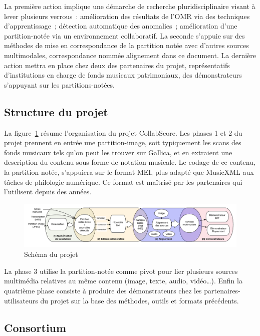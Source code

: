 \documentclass[11pt]{article}
\begin{document}
La première action implique une démarche de recherche pluridisciplinaire visant à lever plusieurs verrous : 
amélioration des résultats de l’OMR via des techniques d’apprentissage ; détection automatique des anomalies ; 
amélioration d’une partition-notée via un environnement collaboratif.  La seconde s’appuie sur des méthodes de 
mise en correspondance de la partition notée avec d’autres sources multimodales, correspondance nommée alignement dans ce document. 
La dernière action mettra en place chez deux des partenaires du projet, représentatifs d’institutions en 
charge de fonds musicaux patrimoniaux, des démonstrateurs s’appuyant sur les partitions-notées.  

\subsection{Structure du projet}

La figure~\ref{schema-projet} résume l'organisation du projet CollabScore.
Les phases 1 et 2 du projet prennent en entrée une partition-image, 
soit typiquement les scans des fonds musicaux tels qu’on peut les trouver 
sur Gallica, et en extraient une description du contenu sous forme de notation musicale. 
Le codage de ce contenu, la partition-notée, s’appuiera sur le format MEI, 
plus adapté que MusicXML aux tâches de philologie numérique. Ce format
 est maîtrisé par les partenaires qui l’utilisent depuis des années. 
 
  \begin{figure}[htb]
  \begin{center}
   \includegraphics[width=\textwidth]{schema_projet.pdf}
    \caption{Schéma du projet}
    \label{schema-projet}
    \end{center}
  \end{figure}

 
 La phase 3 utilise la partition-notée comme pivot pour lier plusieurs sources 
 multimédia relatives au même contenu (image, texte, audio, vidéo…). 
 Enfin la quatrième phase consiste à produire des démonstrateurs  
 chez les partenaires-utilisateurs du projet sur la base des méthodes, outils et formats précédents.

\subsection{Consortium}
\end{document}

